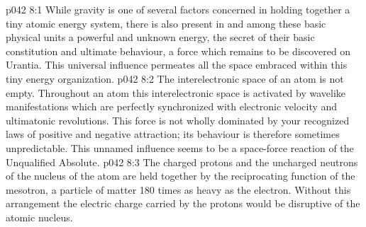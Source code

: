 \vs p042 8:1 While gravity is one of several factors concerned in holding together a tiny atomic energy system, there is also present in and among these basic physical units a powerful and unknown energy, the secret of their basic constitution and ultimate behaviour, a force which remains to be discovered on Urantia. This universal influence permeates all the space embraced within this tiny energy organization.
\vs p042 8:2 The interelectronic space of an atom is not empty. Throughout an atom this interelectronic space is activated by wavelike manifestations which are perfectly synchronized with electronic velocity and ultimatonic revolutions. This force is not wholly dominated by your recognized laws of positive and negative attraction; its behaviour is therefore sometimes unpredictable. This unnamed influence seems to be a space\hyp{}force reaction of the Unqualified Absolute.
\vs p042 8:3 \pc The charged protons and the uncharged neutrons of the nucleus of the atom are held together by the reciprocating function of the mesotron, a particle of matter 180 times as heavy as the electron. Without this arrangement the electric charge carried by the protons would be disruptive of the atomic nucleus.

